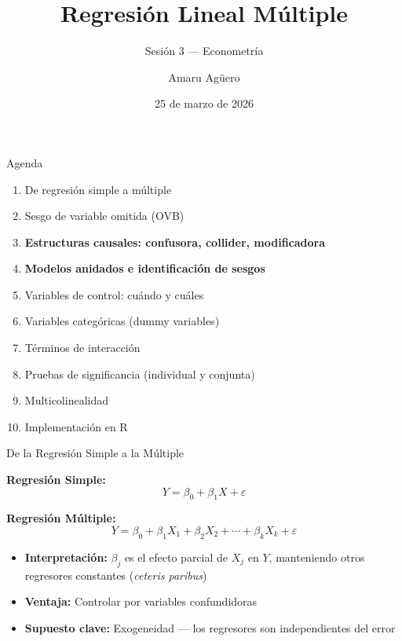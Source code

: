 \documentclass[aspectratio=169,11pt]{beamer}
\institute[CICS --- UDD]{Doctorado en Ciencias de la Complejidad Social --- CICS, UDD}
\title[Regresi\'on Lineal M\'ultiple]{Regresi\'on Lineal M\'ultiple}
\subtitle{Sesi\'on 3 --- Econometr\'ia}
\author[A. Ag\"uero]{Amaru Ag\"uero}
\date{25 de marzo de 2026}
\begin{document}
\begin{frame}
\titlepage
\end{frame}

\begin{frame}{Agenda}
\begin{enumerate}
    \setlength{\itemsep}{3pt}
    \item De regresi\'on simple a m\'ultiple
    \item Sesgo de variable omitida (OVB)
    \item \textbf{Estructuras causales: confusora, collider, modificadora}
    \item \textbf{Modelos anidados e identificaci\'on de sesgos}
    \item Variables de control: cu\'ando y cu\'ales
    \item Variables categ\'oricas (dummy variables)
    \item T\'erminos de interacci\'on
    \item Pruebas de significancia (individual y conjunta)
    \item Multicolinealidad
    \item Implementaci\'on en R
\end{enumerate}
\end{frame}

\begin{frame}{De la Regresi\'on Simple a la M\'ultiple}

\textbf{Regresi\'on Simple:}
\[
Y = \beta_0 + \beta_1 X + \varepsilon
\]
\vspace{0.3cm}

\textbf{Regresi\'on M\'ultiple:}
\[
Y = \beta_0 + \beta_1 X_1 + \beta_2 X_2 + \cdots + \beta_k X_k + \varepsilon
\]

\vspace{0.5cm}

\begin{itemize}
    \setlength{\itemsep}{4pt}
    \item \textbf{Interpretaci\'on:} $\beta_j$ es el efecto parcial de $X_j$ en $Y$, manteniendo otros regresores constantes (\textit{ceteris paribus})
    \item \textbf{Ventaja:} Controlar por variables confundidoras
    \item \textbf{Supuesto clave:} Exogeneidad --- los regresores son independientes del error
\end{itemize}

\end{frame}
\end{document}
